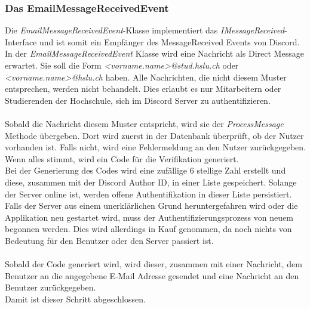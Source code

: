\documentclass[a4paper, table]{article}
\begin{document}
\subsubsection*{Das EmailMessageReceivedEvent}
Die \textit{EmailMessageReceivedEvent}-Klasse implementiert das \textit{IMessageReceived}-Interface und ist somit ein Empfänger des MessageReceived Events von Discord. 
In der \textit{EmailMessageReceivedEvent} Klasse wird eine Nachricht als Direct Message erwartet. 
Sie soll die Form \textit{<vorname.name>@stud.hslu.ch} oder \textit{<vorname.name>@hslu.ch} haben. 
Alle Nachrichten, die nicht diesem Muster entsprechen, werden nicht behandelt. 
Dies erlaubt es nur Mitarbeitern oder Studierenden der Hochschule, sich im Discord Server zu authentifizieren.\\\\
Sobald die Nachricht diesem Muster entspricht, wird sie der \textit{ProcessMessage} Methode übergeben.
Dort wird zuerst in der Datenbank überprüft, ob der Nutzer vorhanden ist. 
Falls nicht, wird eine Fehlermeldung an den Nutzer zurückgegeben. 
Wenn alles stimmt, wird ein Code für die Verifikation generiert.\\
Bei der Generierung des Codes wird eine zufällige 6 stellige Zahl erstellt und diese, zusammen mit der Discord Author ID, in einer Liste gespeichert. 
Solange der Server online ist, werden offene Authentifikation in dieser Liste persistiert. 
Falls der Server aus einem unerklärlichen Grund heruntergefahren wird oder die Applikation neu gestartet wird, muss der Authentifizierungsprozess von neuem begonnen werden. 
Dies wird allerdings in Kauf genommen, da noch nichts von Bedeutung für den Benutzer oder den Server passiert ist.\\\\
Sobald der Code generiert wird, wird dieser, zusammen mit einer Nachricht, dem Benutzer an die angegebene E-Mail Adresse gesendet und eine Nachricht an den Benutzer zurückgegeben. \\
Damit ist dieser Schritt abgeschlossen.
\end{document}
